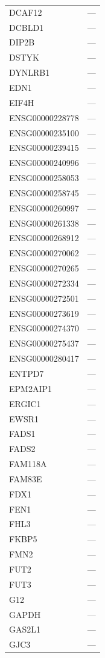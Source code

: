 \begin{longtable}{ll}
  DCAF12 & --- \\
  DCBLD1 & --- \\
  DIP2B & --- \\
  DSTYK & --- \\
  DYNLRB1 & --- \\
  EDN1 & --- \\
  EIF4H & --- \\
  ENSG00000228778 & --- \\
  ENSG00000235100 & --- \\
  ENSG00000239415 & --- \\
  ENSG00000240996 & --- \\
  ENSG00000258053 & --- \\
  ENSG00000258745 & --- \\
  ENSG00000260997 & --- \\
  ENSG00000261338 & --- \\
  ENSG00000268912 & --- \\
  ENSG00000270062 & --- \\
  ENSG00000270265 & --- \\
  ENSG00000272334 & --- \\
  ENSG00000272501 & --- \\
  ENSG00000273619 & --- \\
  ENSG00000274370 & --- \\
  ENSG00000275437 & --- \\
  ENSG00000280417 & --- \\
  ENTPD7 & --- \\
  EPM2AIP1 & --- \\
  ERGIC1 & --- \\
  EWSR1 & --- \\
  FADS1 & --- \\
  FADS2 & --- \\
  FAM118A & --- \\
  FAM83E & --- \\
  FDX1 & --- \\
  FEN1 & --- \\
  FHL3 & --- \\
  FKBP5 & --- \\
  FMN2 & --- \\
  FUT2 & --- \\
  FUT3 & --- \\
  G12 & --- \\
  GAPDH & --- \\
  GAS2L1 & --- \\
  GJC3 & --- \\

\end{longtable}
